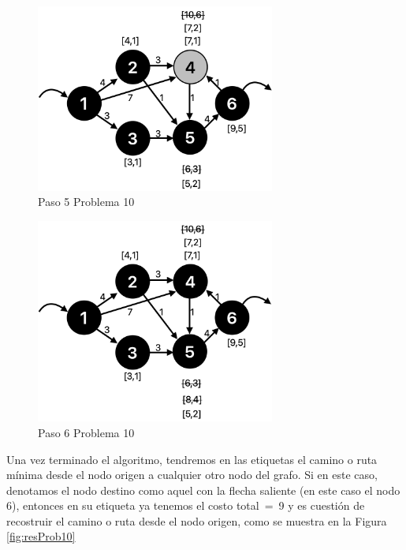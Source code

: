 \documentclass[12pt]{article}  %
\begin{document}
\begin{figure}[H]
\centering
\caption{Paso 5 Problema 10}
\label{fig:paso5Prob10}
\includegraphics[width=0.7\textwidth]{paso5Prob10.png}
\end{figure}

\begin{figure}[H]
\centering
\caption{Paso 6 Problema 10}
\label{fig:paso6Prob10}
\includegraphics[width=0.7\textwidth]{paso6Prob10.png}
\end{figure}

Una vez terminado el algoritmo, tendremos en las etiquetas el camino o ruta mínima desde el nodo origen a cualquier otro nodo del grafo. Si en este caso, denotamos el nodo destino como aquel con la flecha saliente (en este caso el nodo 6), entonces en su etiqueta ya tenemos el costo \mbox{total = 9} y es cuestión de recostruir el camino o ruta desde el nodo origen, como se muestra en la Figura \ref{fig:resProb10}
\end{document}
